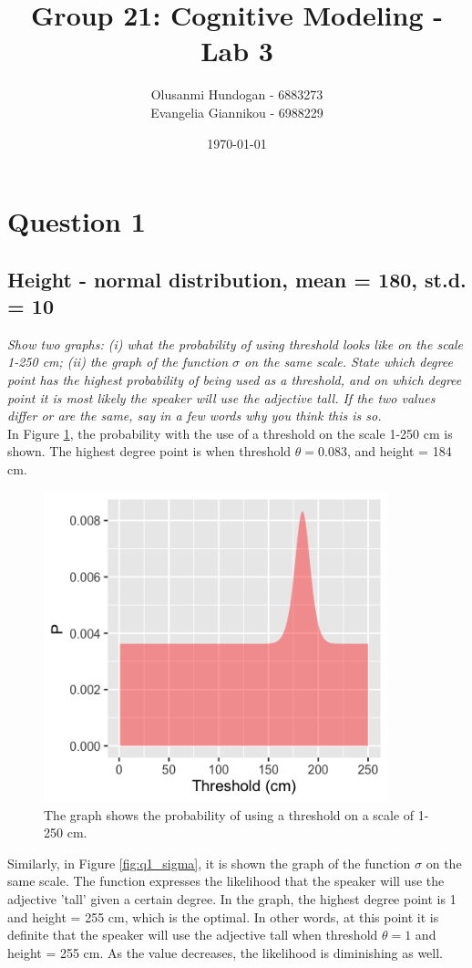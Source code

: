 \documentclass[11pt,a4paper,oneside]{article}
\title{\textbf{Group 21: Cognitive Modeling - Lab 3}}
\date{\today}
\author{Olusanmi Hundogan - 6883273\\
Evangelia Giannikou - 6988229\\
}
\begin{document}
\maketitle

\section{Question 1}
\label{Q1}
\subsection{Height - normal distribution, mean = 180, st.d. = 10}
\textit{Show two graphs: (i) what the probability of using threshold looks like on the scale 1-250 cm; (ii) the graph of the function $\sigma$ on the same scale. State which degree point has the highest probability of being used as a threshold, and on which degree point it is most likely the speaker will use the adjective tall. If the two values differ or are the same, say in a few words why you think this is so.}\\

In Figure \ref{fig:q1_threshold}, the probability with the use of a threshold on the scale 1-250 cm is shown. The highest degree point is when threshold $ \theta = 0.083$, and height = 184 cm.

\begin{figure}[H]
    \centering
    \includegraphics[width=100mm]{figs/Question_1_threshold.png}
    \caption{The graph shows the probability of using a threshold on a scale of 1-250 cm.}
  \label{fig:q1_threshold}
\end{figure}

Similarly, in Figure \ref{fig:q1_sigma}, it is shown the graph of the function $\sigma$ on the same scale. The function expresses the likelihood that the speaker will use the adjective 'tall' given a certain degree. In the graph, the highest degree point is 1 and height = 255 cm, which is the optimal. In other words, at this point it is definite that the speaker will use the adjective tall when threshold $ \theta = 1$ and height = 255 cm. As the value decreases, the likelihood is diminishing as well.
\end{document}
